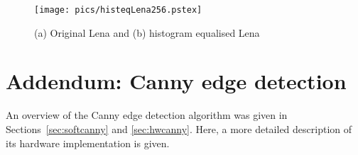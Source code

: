 \documentclass[10pt,twocolumn,letterpaper]{article}
\begin{document}
\begin{figure}[!htb]
\begin{center}
\setlength{\abovecaptionskip}{-0.25cm}
        \texttt{[image: pics/histeqLena256.pstex]}
        \caption{(a) Original Lena and (b) histogram equalised Lena}
        \label{fig:histEq}
\setlength{\abovecaptionskip}{0cm}
\end{center}
\end{figure}

\section{Addendum: Canny edge detection}
An overview of the Canny edge detection algorithm
was given in Sections~\ref{sec:softcanny} and \ref{sec:hwcanny}.
Here, a more detailed description of its hardware implementation
is given.
\end{document}
